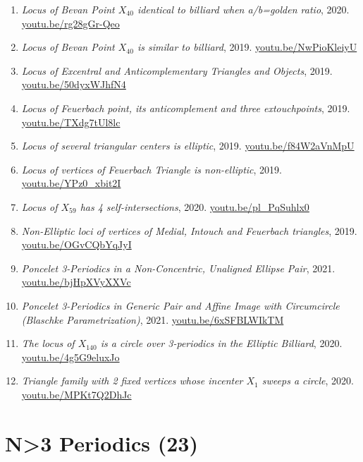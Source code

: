 \documentclass[12pt]{article}
\begin{document}
\begin{enumerate}[resume]
\item \textit{Locus of Bevan Point $X_{40}$ identical to billiard when a/b=golden ratio}, 2020. \href{https://youtu.be/rg28gGr-Qeo}{\url{youtu.be/rg28gGr-Qeo}}
\item \textit{Locus of Bevan Point $X_{40}$ is similar to billiard}, 2019. \href{https://youtu.be/NwPioKleiyU}{\url{youtu.be/NwPioKleiyU}}
\item \textit{Locus of Excentral and Anticomplementary Triangles and Objects}, 2019. \href{https://youtu.be/50dyxWJhfN4}{\url{youtu.be/50dyxWJhfN4}}
\item \textit{Locus of Feuerbach point, its anticomplement and three extouchpoints}, 2019. \href{https://youtu.be/TXdg7tUl8lc}{\url{youtu.be/TXdg7tUl8lc}}
\item \textit{Locus of several triangular centers is elliptic}, 2019. \href{https://youtu.be/f84W2aVnMpU}{\url{youtu.be/f84W2aVnMpU}}
\item \textit{Locus of vertices of Feuerbach Triangle is non-elliptic}, 2019. \href{https://youtu.be/YPz0_xbit2I}{\url{youtu.be/YPz0\_xbit2I}}
\item \textit{Locus of $X_{59}$ has 4 self-intersections}, 2020. \href{https://youtu.be/pl_PqSuhlx0}{\url{youtu.be/pl\_PqSuhlx0}}
\item \textit{Non-Elliptic loci of vertices of Medial, Intouch and Feuerbach triangles}, 2019. \href{https://youtu.be/OGvCQbYqJyI}{\url{youtu.be/OGvCQbYqJyI}}
\item \textit{Poncelet 3-Periodics in a Non-Concentric, Unaligned Ellipse Pair}, 2021. \href{https://youtu.be/bjHpXVyXXVc}{\url{youtu.be/bjHpXVyXXVc}}
\item \textit{Poncelet 3-Periodics in Generic Pair and Affine Image with Circumcircle (Blaschke Parametrization)}, 2021. \href{https://youtu.be/6xSFBLWIkTM}{\url{youtu.be/6xSFBLWIkTM}}
\item \textit{The locus of $X_{140}$ is a circle over 3-periodics in the Elliptic Billiard}, 2020. \href{https://youtu.be/4g5G9eluxJo}{\url{youtu.be/4g5G9eluxJo}}
\item \textit{Triangle family with 2 fixed vertices whose incenter $X_{1}$ sweeps a circle}, 2020. \href{https://youtu.be/MPKt7Q2DhJc}{\url{youtu.be/MPKt7Q2DhJc}}
\end{enumerate}

\section{N>3 Periodics (23)}
\end{document}
